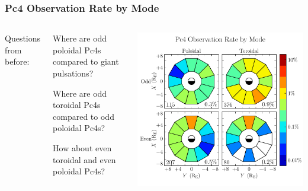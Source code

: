 \documentclass{beamer}
\begin{document}
\begin{frame}
\frametitle{Pc4 Observation Rate by Mode}

\begin{columns}
Questions from before:

\vspace{5pt}

\begin{wideitemize}
\item Where are odd poloidal Pc4s compared to giant pulsations?
\item Where are odd toroidal Pc4s compared to odd poloidal Pc4s?
\item How about even toroidal and even poloidal Pc4s?
\end{wideitemize}
\includegraphics[width=\textwidth]{figures/mode_all.pdf}
\end{columns}

\end{frame}

\end{document}
